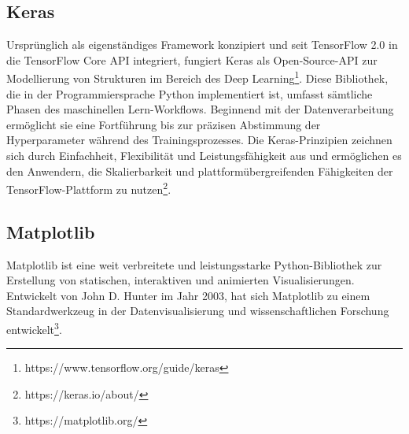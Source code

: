 \subsection{Keras}
Ursprünglich als eigenständiges Framework konzipiert und seit TensorFlow 2.0 in die TensorFlow Core API integriert, fungiert Keras als Open-Source-API zur Modellierung von Strukturen im Bereich des Deep Learning\footnote{https://www.tensorflow.org/guide/keras}. Diese Bibliothek, die in der Programmiersprache Python implementiert ist, umfasst sämtliche Phasen des maschinellen Lern-Workflows. Beginnend mit der Datenverarbeitung ermöglicht sie eine Fortführung bis zur präzisen Abstimmung der Hyperparameter während des Trainingsprozesses. Die Keras-Prinzipien zeichnen sich durch Einfachheit, Flexibilität und Leistungsfähigkeit aus und ermöglichen es den Anwendern, die Skalierbarkeit und plattformübergreifenden Fähigkeiten der TensorFlow-Plattform zu nutzen\footnote{https://keras.io/about/}.

\subsection{Matplotlib}
Matplotlib ist eine weit verbreitete und leistungsstarke Python-Bibliothek zur Erstellung von statischen, interaktiven und animierten Visualisierungen. Entwickelt von John D. Hunter im Jahr 2003, hat sich Matplotlib zu einem Standardwerkzeug in der Datenvisualisierung und wissenschaftlichen Forschung entwickelt\footnote{https://matplotlib.org/}.